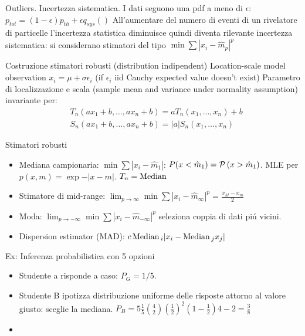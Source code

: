 \documentclass[asd-beamer.tex]{subfiles}
\begin{document}
\begin{frame}{Outliers. Incertezza sistematica.}
I dati seguono una pdf a meno di $\epsilon$: $p_{tot}=(1-\epsilon)p_{th}+\epsilon q_{sys}()$
All'aumentare del numero di eventi di un rivelatore di particelle l'incertezza statistica diminuisce quindi diventa rilevante incertezza sistematica: si considerano stimatori del tipo $\min\sum|x_i-\hat{m}_p|^p$
\begin{block}{Costruzione stimatori robusti (distribution indipendent)}
Location-scale model observation $x_i=\mu+\sigma\epsilon_i$ (if $\epsilon_i$ iid Cauchy expected value doesn't exist)
Parametro di localizzazione e scala (sample mean and variance under normality assumption) invariante per:
\begin{align*}
&T_n(ax_1+b,\ldots,ax_n+b)=aT_n(x_1,\ldots,x_n)+b\\
&S_n(ax_1+b,\ldots,ax_n+b)=|a|S_n(x_1,\ldots,x_n)
\end{align*}
\end{block}
\end{frame}

\begin{frame}{Stimatori robusti}
\begin{itemize}
\item Mediana campionaria: $\min\sum|x_i-\hat{m}_1|$: $P(x<\hat{m}_1)=\operatorname{\mathcal{P}}{(x>\hat{m}_1)}$. MLE per $p(x,m)=\exp{-|x-m|}$. $T_n=\operatorname{Median}{}$
\item Stimatore di mid-range: $\lim_{p\to\infty}\min\sum|x_i-\hat{m}_{\infty}|^p=\frac{x_M-x_m}{2}$
\item Moda:	$\lim_{p\to-\infty}\min\sum|x_i-\hat{m}_{-\infty}|^p$ seleziona coppia di dati pi\'u vicini.
\item Dispersion estimator (MAD): $c\operatorname{Median}{}_i|x_i-\operatorname{Median}{}_jx_j|$
\end{itemize}
\end{frame}

\begin{wordonframe}{Ex: Inferenza probabilistica}
 con  5 opzioni
\begin{itemize}
\item Studente a risponde a caso: $P_G=1/5$.
\item Studente B ipotizza distribuzione uniforme delle risposte attorno al valore giusto: sceglie la mediana. $P_B=5\frac{1}{5}\binom{4}{2}(\frac{1}{2})^2(1-\frac{1}{2}){4-2}=\frac{3}{8}$
\item {}
\end{itemize}

\end{wordonframe}
\end{document}
